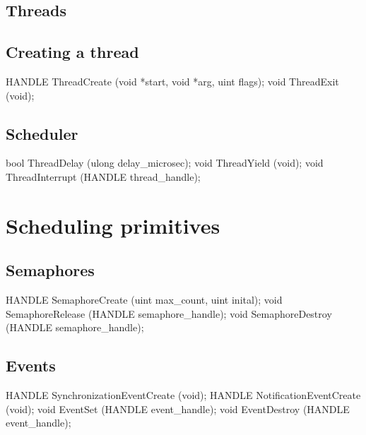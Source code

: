 \subsection{Threads}
\label{sec:abi:thread}


\subsection*{Creating a thread}

\begin{paldef}
HANDLE ThreadCreate (void *start, void *arg, uint flags);
void ThreadExit (void);
\end{paldef}




\subsection*{Scheduler}

\begin{paldef}
bool ThreadDelay     (ulong delay_microsec);
void ThreadYield     (void);
void ThreadInterrupt (HANDLE thread_handle);
\end{paldef}







\section{Scheduling primitives}


\subsection*{Semaphores}

\begin{paldef}
HANDLE SemaphoreCreate  (uint max_count, uint inital);
void   SemaphoreRelease (HANDLE semaphore_handle);
void   SemaphoreDestroy (HANDLE semaphore_handle);
\end{paldef}


\subsection*{Events}


\begin{paldef}
HANDLE SynchronizationEventCreate (void);
HANDLE NotificationEventCreate    (void);
void EventSet     (HANDLE event_handle);
void EventDestroy (HANDLE event_handle);
\end{paldef}



